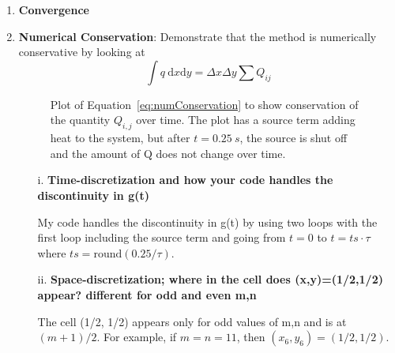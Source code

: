\begin{enumerate}
	\item \textbf{Convergence }
	\item \textbf{Numerical Conservation}: Demonstrate that the method is numerically conservative by looking at 
	\begin{equation}
		\int q \mathrm{~d}x \mathrm{d}y = \Delta x \Delta y \sum Q_{ij} \label{eq:numConservation} 
	\end{equation}%
\begin{figure}
	[htbp] \centering 
	\caption{Plot of Equation~\eqref{eq:numConservation} to show conservation of the quantity $Q_{i,j}$ over time.  The plot has a source term adding heat to the system, but after $t=0.25~s$, the source is shut off and the amount of Q does not change over time.}
\end{figure} %

	\begin{itemize}
		\item[i.] \textbf{Time-discretization and how your code handles the discontinuity in g(t)}
		
		{\color{blue} My code handles the discontinuity in g(t) by using two loops with the first loop including the source term and going from $t=0$ to $t= ts \cdot \tau$ where $ts=\mathrm{round}(0.25/\tau)$.} 
		\item[ii.] \textbf{Space-discretization; where in the cell does (x,y)=(1/2,1/2) appear? different for odd and even m,n}
		
		{\color{blue} The cell (1/2, 1/2) appears only for odd values of m,n and is at $(m+1)/2$. For example, if $m=n=11$, then $(x_{6},y_{6}) = (1/2,1/2)$.} 
	\end{itemize}
\end{enumerate}

